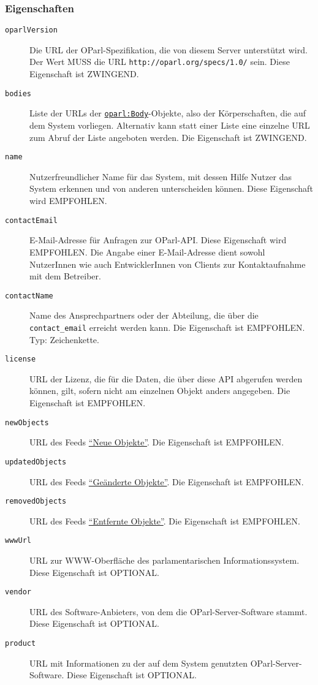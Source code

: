 \documentclass[,a4paper]{article}
\begin{document}
\subsubsection{Eigenschaften}\label{eigenschaften}

\begin{description}
\item[\texttt{oparlVersion}]
Die URL der OParl-Spezifikation, die von diesem Server unterstützt wird.
Der Wert MUSS die URL \texttt{http://oparl.org/specs/1.0/} sein. Diese
Eigenschaft ist ZWINGEND.
\item[\texttt{bodies}]
Liste der URLs der
\hyperref[oparlux5fbody]{\texttt{oparl:Body}}-Objekte, also der
Körperschaften, die auf dem System vorliegen. Alternativ kann statt
einer Liste eine einzelne URL zum Abruf der Liste angeboten werden. Die
Eigenschaft ist ZWINGEND.
\item[\texttt{name}]
Nutzerfreundlicher Name für das System, mit dessen Hilfe Nutzer das
System erkennen und von anderen unterscheiden können. Diese Eigenschaft
wird EMPFOHLEN.
\item[\texttt{contactEmail}]
E-Mail-Adresse für Anfragen zur OParl-API. Diese Eigenschaft wird
EMPFOHLEN. Die Angabe einer E-Mail-Adresse dient sowohl NutzerInnen wie
auch EntwicklerInnen von Clients zur Kontaktaufnahme mit dem Betreiber.
\item[\texttt{contactName}]
Name des Ansprechpartners oder der Abteilung, die über die
\texttt{contact\_email} erreicht werden kann. Die Eigenschaft ist
EMPFOHLEN. Typ: Zeichenkette.
\item[\texttt{license}]
URL der Lizenz, die für die Daten, die über diese API abgerufen werden
können, gilt, sofern nicht am einzelnen Objekt anders angegeben. Die
Eigenschaft ist EMPFOHLEN.
\item[\texttt{newObjects}]
URL des Feeds \hyperref[feedux5fneueux5fobjekte]{``Neue Objekte''}. Die
Eigenschaft ist EMPFOHLEN.
\item[\texttt{updatedObjects}]
URL des Feeds \hyperref[feedux5fgeaenderteux5fobjekte]{``Geänderte
Objekte''}. Die Eigenschaft ist EMPFOHLEN.
\item[\texttt{removedObjects}]
URL des Feeds \hyperref[feedux5fentfernteux5fobjekte]{``Entfernte
Objekte''}. Die Eigenschaft ist EMPFOHLEN.
\item[\texttt{wwwUrl}]
URL zur WWW-Oberfläche des parlamentarischen Informationssystem. Diese
Eigenschaft ist OPTIONAL.
\item[\texttt{vendor}]
URL des Software-Anbieters, von dem die OParl-Server-Software stammt.
Diese Eigenschaft ist OPTIONAL.
\item[\texttt{product}]
URL mit Informationen zu der auf dem System genutzten
OParl-Server-Software. Diese Eigenschaft ist OPTIONAL.
\end{description}
\end{document}

